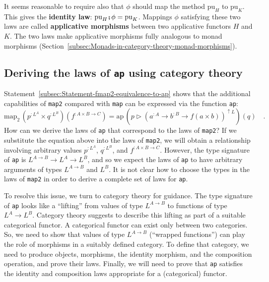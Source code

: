 It seems reasonable to require also that $\phi$ should map the method
$\text{pu}_{H}$ to $\text{pu}_{K}$. This gives the \textbf{identity
law}: $\text{pu}_{H}\bef\phi=\text{pu}_{K}$.
Mappings $\phi$ satisfying these two laws are called \textbf{applicative
morphisms} between two applicative functors
$H$ and $K$. The two laws make applicative morphisms fully analogous
to monad morphisms (Section~\ref{subsec:Monads-in-category-theory-monad-morphisms}).

\subsection{Deriving the laws of \texttt{ap} using category theory}

Statement~\ref{subsec:Statement-fmap2-equivalence-to-ap} shows that
the additional capabilities of \lstinline!map2! compared with \lstinline!map!
can be expressed via the function \lstinline!ap!:
\[
\text{map}_{2}\,(p^{:L^{A}}\times q^{:L^{B}})(f^{:A\times B\rightarrow C})=\text{ap}\,(p\triangleright(a^{:A}\rightarrow b^{:B}\rightarrow f(a\times b))^{\uparrow L})(q)\quad.
\]
How can we derive the laws of \lstinline!ap! that correspond to the
laws of \lstinline!map2!? If we substitute the equation above into
the laws of \lstinline!map2!, we will obtain a relationship involving
arbitrary values $p^{:L^{A}}$, $q^{:L^{B}}$, and $f^{:A\times B\rightarrow C}$.
However, the type signature of \lstinline!ap! is $L^{A\rightarrow B}\rightarrow L^{A}\rightarrow L^{B}$,
and so we expect the laws of \lstinline!ap! to have arbitrary arguments
of types $L^{A\rightarrow B}$ and $L^{B}$. It is not clear how to
choose the types in the laws of \lstinline!map2! in order to derive
a complete set of laws for \lstinline!ap!.

To resolve this issue, we turn to category theory for guidance. The
type signature of \lstinline!ap! looks like a \textsf{``}lifting\textsf{''} from
values of type $L^{A\rightarrow B}$ to functions of type $L^{A}\rightarrow L^{B}$.
Category theory suggests to describe this lifting as part of a suitable
categorical functor.
A categorical functor can exist only between two categories. So, we
need to show that values of type $L^{A\rightarrow B}$ (\textsf{``}wrapped
functions\textsf{''}) can play the role of morphisms in a suitably defined
category. To define that category, we need to produce objects, morphisms,
the identity morphism, and the composition operation, and prove their
laws. Finally, we will need to prove that \lstinline!ap! satisfies
the identity and composition laws appropriate for a (categorical)
functor.

